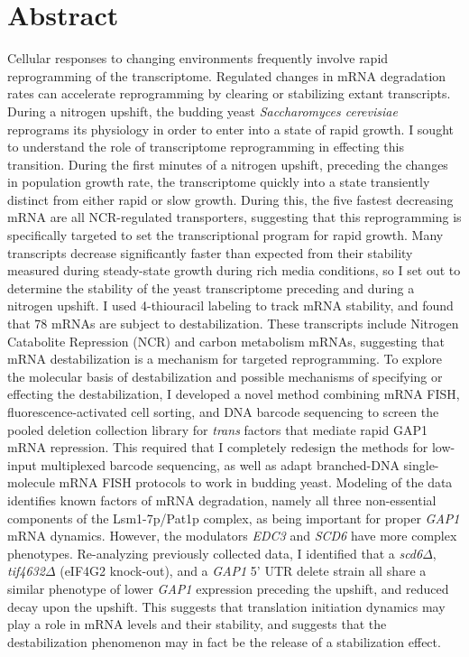 \documentclass[12pt,letterpaper]{memoir}
\begin{document}
\newpage
\pagestyle{plain}

\section*{Abstract}

Cellular responses to changing environments frequently involve rapid
reprogramming of the transcriptome. Regulated
changes in mRNA degradation rates can accelerate reprogramming by
clearing or stabilizing extant transcripts. 
During a nitrogen upshift, the budding yeast \textit{Saccharomyces
cerevisiae} reprograms its physiology in order to enter into  
a state of rapid growth. 
I sought to understand the role of transcriptome reprogramming
in effecting this transition.
During the first minutes of a nitrogen upshift,
preceding the changes in population growth rate,
the transcriptome quickly into a state transiently distinct from
either rapid or slow growth.
During this, the five fastest decreasing mRNA are all NCR-regulated 
transporters, suggesting that this reprogramming is specifically
targeted to set the transcriptional program for rapid growth.
Many transcripts decrease significantly faster than expected from
their stability measured during steady-state growth during
rich media conditions, so I set out to determine the stability of
the yeast transcriptome preceding and during a nitrogen upshift.
I used 4-thiouracil labeling to track mRNA stability, and found 
that 78 mRNAs are subject to destabilization. 
These transcripts include
Nitrogen Catabolite Repression (NCR) and carbon metabolism mRNAs,
suggesting that mRNA destabilization is a mechanism for targeted
reprogramming. 
To explore the molecular basis of destabilization and possible
mechanisms of specifying or effecting the destabilization, I
developed a novel method combining mRNA FISH, fluorescence-activated
cell sorting, and DNA barcode sequencing to screen the pooled deletion
collection library for \textit{trans} factors that mediate rapid GAP1 mRNA
repression. This required that I completely redesign the methods for 
low-input multiplexed barcode sequencing, as well as adapt 
branched-DNA single-molecule mRNA FISH protocols to work in budding
yeast. Modeling of the data identifies known factors of mRNA
degradation, namely all three non-essential components of the
Lsm1-7p/Pat1p complex, as being important for proper \textit{GAP1}
mRNA dynamics. However, the modulators \textit{EDC3} and \textit{SCD6}
have more complex phenotypes. Re-analyzing previously collected data,
I identified that a \textit{scd6}$\Delta$, \textit{tif4632}$\Delta$
(eIF4G2 knock-out), and a \textit{GAP1} 5' UTR delete strain all
share a similar phenotype of lower \textit{GAP1} expression preceding
the upshift, and reduced decay upon the upshift. This suggests that 
translation initiation dynamics may play a role in mRNA levels and 
their stability, and suggests that the destabilization phenomenon 
may in fact be the release of a stabilization effect.

\newpage

\tableofcontents*

\mainmatter







\printbibliography[heading=bibintoc,title={References}]
\end{document}
